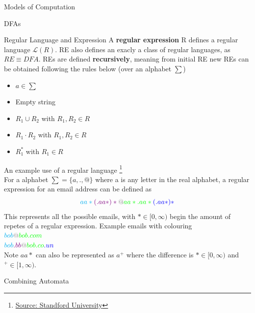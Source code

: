 \documentclass[12pt, letterpaper]{article}
\begin{document}
\begin{section}{Models of Computation}
\begin{subsection}{DFAs}
\begin{subsubsection}{Regular Language and Expression}
      A \textbf{regular expression} R defines a regular language \(\mathscr{L}(R)\).
      RE also defines an exacly a class of regular languages, as \(RE \equiv DFA\).
      REs are defined \textbf{recursively}, meaning from initial RE new REs can
      be obtained following the rules below (over an alphabet \(\sum\))
      \begin{itemize}
        \item \(a \in \sum\)
        \item Empty string
        \item \(R_{1} \cup R_{2}\) with \(R_{1}, R_{2} \in R\)
        \item \(R_{1} \cdot R_{2}\) with \(R_{1}, R_{2} \in R\)
        \item \(R_{1}^{*}\) with \(R_{1} \in R\)
      \end{itemize}

      An example use of a regular language
      \footnote{
        \href{https://web.stanford.edu/class/archive/cs/cs103/cs103.1134/lectures/14/Small14.pdf}
        {Source: Standford University}} \\
      For a alphabet \(\sum = \{ a, ., @ \}\) where a is any letter in the real
      alphabet, a regular expression for an email address can be defined as \\
      \[\color{cyan} aa* \color{violet} (.aa*)* \color{gray} @
        \color{green} aa*.aa* \color{blue} (.aa*)*\]
      This represents all the possible emails, with \(* \in [0, \infty)\) begin
      the amount of repetes of a regular expression. Example emails with
      colouring \\
      \(\color{cyan} bob \color{gray} @
      \color{green} bob.com \) \\
      \(\color{cyan} bob \color{violet} .bb \color{gray} @
      \color{green} bob.co \color{blue} .un\) \\
      Note \(aa*\) can also be represented as \(a^{+}\) where the difference is
      \(* \in [0, \infty)\) and \(^{+} \in [1, \infty)\).
            
    \end{subsubsection}

    \begin{subsubsection}{Combining Automata}


\end{subsubsection}
\end{subsection}
\end{section}
\end{document}

